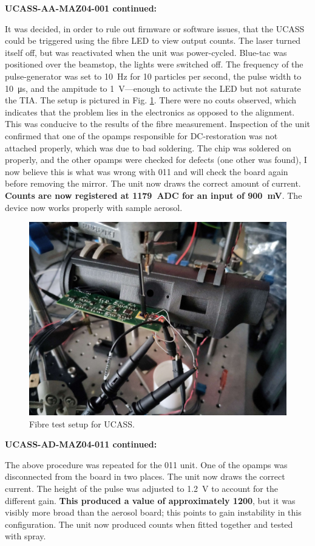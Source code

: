 

\textbf{UCASS-AA-MAZ04-001 continued:}

It was decided, in order to rule out firmware or software issues, that the UCASS could be triggered using the fibre LED to view output counts. The laser turned itself off, but was reactivated when the unit was power-cycled. Blue-tac was positioned over the beamstop, the lights were switched off. The frequency of the pulse-generator was set to \SI{10}{\hertz} for 10 particles per second, the pulse width to \SI{10}{\micro\second}, and the ampitude to \SI{1}{\volt}---enough to activate the LED but not saturate the TIA. The setup is pictured in Fig. \ref{fig:UCASSFibreRig}. There were no couts observed, which indicates that the problem lies in the electronics as opposed to the alignment. This was conducive to the results of the fibre measurement. Inspection of the unit confirmed that one of the opamps responsible for DC-restoration was not attached properly, which was due to bad soldering. The chip was soldered on properly, and the other opamps were checked for defects (one other was found), I now believe this is what was wrong with 011 and will check the board again before removing the mirror. The unit now draws the correct amount of current. \textbf{Counts are now registered at \SI{1179}{ADC} for an input of \SI{900}{\milli\volt}}. The device now works properly with sample aerosol.

\begin{figure}[H]
\begin{center}
\includegraphics[width=0.5\linewidth]{Figures/UCASSFibreRig}
\end{center}
\caption{Fibre test setup for UCASS.}
\label{fig:UCASSFibreRig}
\end{figure}

\textbf{UCASS-AD-MAZ04-011 continued:}

The above procedure was repeated for the 011 unit. One of the opamps was disconnected from the board in two places. The unit now draws the correct current. The height of the pulse was adjusted to \SI{1.2}{\volt} to account for the different gain. \textbf{This produced a value of approximately 1200}, but it was visibly more broad than the aerosol board; this points to gain instability in this configuration. The unit now produced counts when fitted together and tested with spray.

